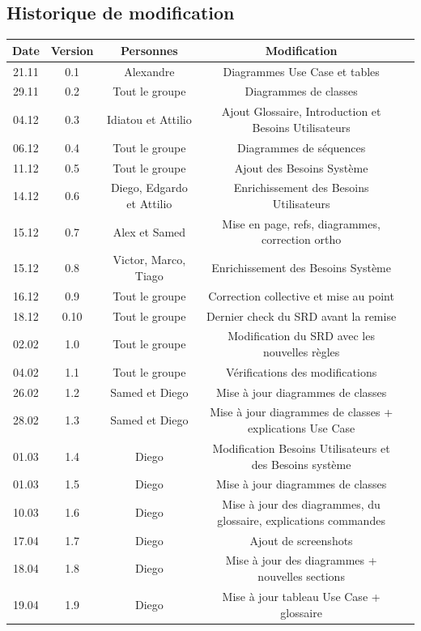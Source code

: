 \documentclass[french]{article}
\begin{document}
\subsection {Historique de modification}

\begin{center}
\begin{tabular}{ |c|c|c|c|c| } 
\hline
Date & Version & Personnes & Modification  \\
\hline
21.11 & 0.1 & Alexandre & Diagrammes Use Case et tables \\
29.11 & 0.2 & Tout le groupe & Diagrammes de classes \\
04.12 & 0.3 & Idiatou et Attilio & Ajout Glossaire, Introduction et Besoins Utilisateurs \\ 
06.12 & 0.4 & Tout le groupe & Diagrammes de séquences \\
11.12 & 0.5 & Tout le groupe & Ajout des Besoins Système \\ 
14.12 & 0.6 & Diego, Edgardo et Attilio & Enrichissement des Besoins Utilisateurs \\
15.12 & 0.7 & Alex et Samed & Mise en page, refs, diagrammes, correction ortho \\
15.12 & 0.8 & Victor, Marco, Tiago & Enrichissement des Besoins Système \\
16.12 & 0.9 & Tout le groupe & Correction collective et mise au point \\
18.12 & 0.10 & Tout le groupe & Dernier check du SRD avant la remise \\
02.02 & 1.0 & Tout le groupe & Modification du SRD avec les nouvelles règles \\
04.02 & 1.1 & Tout le groupe & Vérifications des modifications \\ 
26.02 & 1.2 & Samed et Diego & Mise à jour diagrammes de classes\\
28.02 & 1.3 & Samed et Diego & Mise à jour diagrammes de classes + explications Use Case\\
01.03 & 1.4 & Diego          & Modification Besoins Utilisateurs et des Besoins système\\
01.03 & 1.5 & Diego          & Mise à jour diagrammes de classes\\
10.03 & 1.6 & Diego          & Mise à jour des diagrammes, du glossaire, explications commandes\\
17.04 & 1.7 & Diego          & Ajout de screenshots\\
18.04 & 1.8 & Diego          & Mise à jour des diagrammes + nouvelles sections\\
19.04 & 1.9 & Diego          & Mise à jour tableau Use Case + glossaire\\
\hline
\end{tabular}
\end{center}
\end{document}
